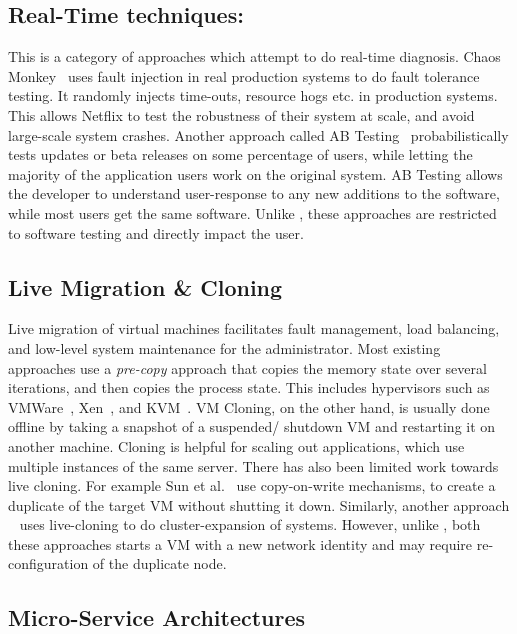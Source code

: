 \subsection{Real-Time techniques:}
This is a category of approaches which attempt to do real-time diagnosis.
Chaos Monkey~\cite{chaosmonkey} uses fault injection in real production systems to do fault tolerance testing.
It randomly injects time-outs, resource hogs etc. in production systems. 
This allows Netflix to test the robustness of their system at scale, and avoid large-scale system crashes.  
Another approach called AB Testing~\cite{abtesting} probabilistically tests updates or beta releases on some percentage of users, 
while letting the majority of the application users work on the original system.
AB Testing allows the developer to understand user-response to any new additions to the software, while most users get the same software.
Unlike \parikshan, these approaches are restricted to software testing and directly impact the user.


\subsection{Live Migration \& Cloning}
Live migration of virtual machines facilitates fault management, load balancing, and low-level system maintenance for the administrator.
Most existing approaches use a \textit{pre-copy} approach that copies the memory state over several iterations, and then copies the process state.
This includes hypervisors such as VMWare~\cite{nelson2005fast}, Xen~\cite{clark2005live}, and KVM~\cite{kivity2007kvm}.
VM Cloning, on the other hand, is usually done offline by taking a snapshot of a suspended/ shutdown VM and restarting it on another machine.
Cloning is helpful for scaling out applications, which use multiple instances of the same server.
There has also been limited work towards live cloning. 
For example Sun et al.~\cite{Sun:2009:FLC:1581383.1582148} use copy-on-write mechanisms, to create a duplicate of the target VM without shutting it down.
Similarly, another approach ~\cite{gebhart2009dynamic} uses live-cloning to do cluster-expansion of systems.
However, unlike \parikshan, both these approaches starts a VM with a new network identity and may require re-configuration of the duplicate node.


\subsection{Micro-Service Architectures}

